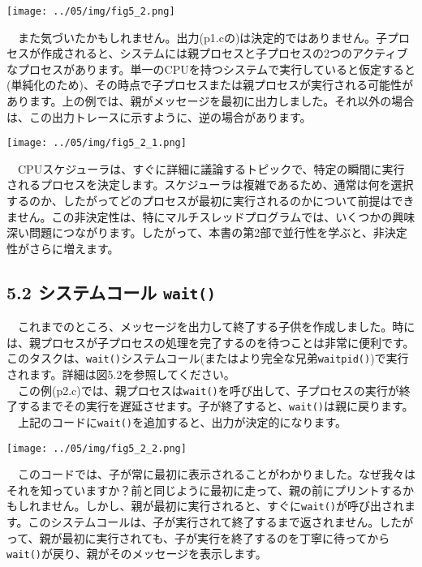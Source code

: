\texttt{[image: ../05/img/fig5\_2.png]}

　また気づいたかもしれません。出力(p1.cの)は決定的ではありません。子プロセスが作成されると、システムには親プロセスと子プロセスの2つのアクティブなプロセスがあります。単一のCPUを持つシステムで実行していると仮定すると(単純化のため)、その時点で子プロセスまたは親プロセスが実行される可能性があります。上の例では、親がメッセージを最初に出力しました。それ以外の場合は、この出力トレースに示すように、逆の場合があります。

\texttt{[image: ../05/img/fig5\_2\_1.png]}

　CPUスケジューラは、すぐに詳細に議論するトピックで、特定の瞬間に実行されるプロセスを決定します。スケジューラは複雑であるため、通常は何を選択するのか、したがってどのプロセスが最初に実行されるのかについて前提はできません。この非決定性は、特にマルチスレッドプログラムでは、いくつかの興味深い問題につながります。したがって、本書の第2部で並行性を学ぶと、非決定性がさらに増えます。

\hypertarget{ux30b7ux30b9ux30c6ux30e0ux30b3ux30fcux30eb-wait}{%
\subsection*{\texorpdfstring{5.2 システムコール
\texttt{wait()}}{5.2 システムコール wait()}}\label{ux30b7ux30b9ux30c6ux30e0ux30b3ux30fcux30eb-wait}}

　これまでのところ、メッセージを出力して終了する子供を作成しました。時には、親プロセスが子プロセスの処理を完了するのを待つことは非常に便利です。このタスクは、\texttt{wait()}システムコール(またはより完全な兄弟\texttt{waitpid()})で実行されます。詳細は図5.2を参照してください。\\
　この例(p2.c)では、親プロセスは\texttt{wait()}を呼び出して、子プロセスの実行が終了するまでその実行を遅延させます。子が終了すると、\texttt{wait()}は親に戻ります。\\
　上記のコードに\texttt{wait()}を追加すると、出力が決定的になります。

\texttt{[image: ../05/img/fig5\_2\_2.png]}

　このコードでは、子が常に最初に表示されることがわかりました。なぜ我々はそれを知っていますか？前と同じように最初に走って、親の前にプリントするかもしれません。しかし、親が最初に実行されると、すぐに\texttt{wait()}が呼び出されます。このシステムコールは、子が実行されて終了するまで返されません。したがって、親が最初に実行されても、子が実行を終了するのを丁寧に待ってから\texttt{wait()}が戻り、親がそのメッセージを表示します。

